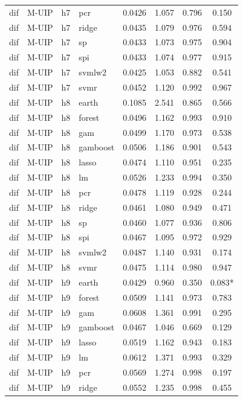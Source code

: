 \begin{ThreePartTable}
\begin{longtable}[t]{llclcccc}
dif & M-UIP & h7 & pcr & 0.0426 & 1.057 & 0.796 & 0.150\\
dif & M-UIP & h7 & ridge & 0.0435 & 1.079 & 0.976 & 0.594\\
dif & M-UIP & h7 & sp & 0.0433 & 1.073 & 0.975 & 0.904\\
dif & M-UIP & h7 & spi & 0.0433 & 1.074 & 0.977 & 0.915\\
dif & M-UIP & h7 & svmlw2 & 0.0425 & 1.053 & 0.882 & 0.541\\
dif & M-UIP & h7 & svmr & 0.0452 & 1.120 & 0.992 & 0.967\\
\addlinespace
dif & M-UIP & h8 & earth & 0.1085 & 2.541 & 0.865 & 0.566\\
dif & M-UIP & h8 & forest & 0.0496 & 1.162 & 0.993 & 0.910\\
dif & M-UIP & h8 & gam & 0.0499 & 1.170 & 0.973 & 0.538\\
dif & M-UIP & h8 & gamboost & 0.0506 & 1.186 & 0.901 & 0.543\\
dif & M-UIP & h8 & lasso & 0.0474 & 1.110 & 0.951 & 0.235\\
dif & M-UIP & h8 & lm & 0.0526 & 1.233 & 0.994 & 0.350\\
dif & M-UIP & h8 & pcr & 0.0478 & 1.119 & 0.928 & 0.244\\
dif & M-UIP & h8 & ridge & 0.0461 & 1.080 & 0.949 & 0.471\\
dif & M-UIP & h8 & sp & 0.0460 & 1.077 & 0.936 & 0.806\\
dif & M-UIP & h8 & spi & 0.0467 & 1.095 & 0.972 & 0.929\\
dif & M-UIP & h8 & svmlw2 & 0.0487 & 1.140 & 0.931 & 0.174\\
dif & M-UIP & h8 & svmr & 0.0475 & 1.114 & 0.980 & 0.947\\
\addlinespace
dif & M-UIP & h9 & earth & 0.0429 & 0.960 & 0.350 & 0.083*\\
dif & M-UIP & h9 & forest & 0.0509 & 1.141 & 0.973 & 0.783\\
dif & M-UIP & h9 & gam & 0.0608 & 1.361 & 0.991 & 0.295\\
dif & M-UIP & h9 & gamboost & 0.0467 & 1.046 & 0.669 & 0.129\\
dif & M-UIP & h9 & lasso & 0.0519 & 1.162 & 0.943 & 0.183\\
dif & M-UIP & h9 & lm & 0.0612 & 1.371 & 0.993 & 0.329\\
dif & M-UIP & h9 & pcr & 0.0569 & 1.274 & 0.998 & 0.197\\
dif & M-UIP & h9 & ridge & 0.0552 & 1.235 & 0.998 & 0.455\\

\end{longtable}
\end{ThreePartTable}
